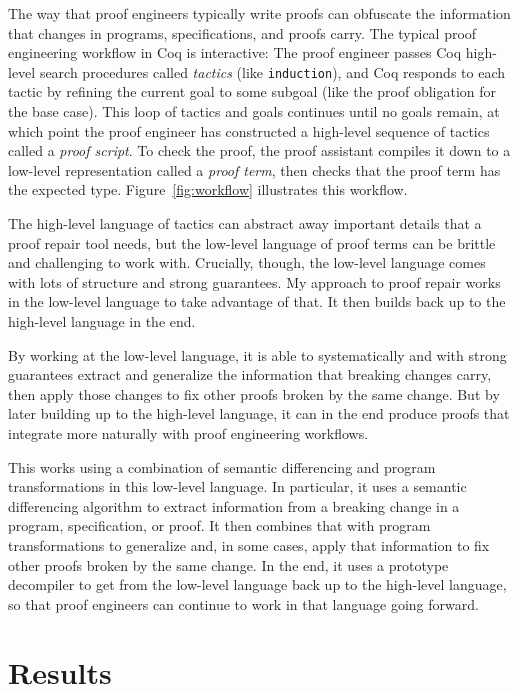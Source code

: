 The way that proof engineers typically write proofs can obfuscate the information that changes in programs, specifications, and proofs carry.
The typical proof engineering workflow in Coq is interactive: The proof engineer passes Coq high-level
search procedures called \textit{tactics} (like \lstinline{induction}), and Coq responds to each tactic
by refining the current goal to some subgoal (like the proof obligation for the base case). This loop of tactics and goals 
continues until no goals remain, at which point the proof engineer has constructed a high-level sequence of tactics called a \textit{proof script}.
To check the proof, the proof assistant compiles it down to a low-level representation called a \textit{proof term},
then checks that the proof term has the expected type.
Figure~\ref{fig:workflow} illustrates this workflow.

The high-level language of tactics can abstract away important details that a proof repair tool needs,
but the low-level language of proof terms can be brittle and challenging to work with.
Crucially, though, the low-level language comes with lots of structure and strong guarantees.
My approach to proof repair works in the low-level language to take advantage of that.
It then builds back up to the high-level language in the end.

By working at the low-level language, it is able to systematically and with strong guarantees extract and generalize the 
information that breaking changes carry,
then apply those changes to fix other proofs broken by the same change.
But by later building up to the high-level language,
it can in the end produce proofs that integrate more naturally with proof engineering workflows.

This works using a combination of semantic differencing and program transformations in this low-level language.
In particular, it uses a semantic differencing algorithm to extract information from a breaking change in a program, specification, or proof.
It then combines that with program transformations to generalize and, in some cases, apply that information to fix other 
proofs broken by the same change.
In the end, it uses a prototype decompiler to get from the low-level language back up to the high-level language,
so that proof engineers can continue to work in that language going forward. %

\section{Results}

